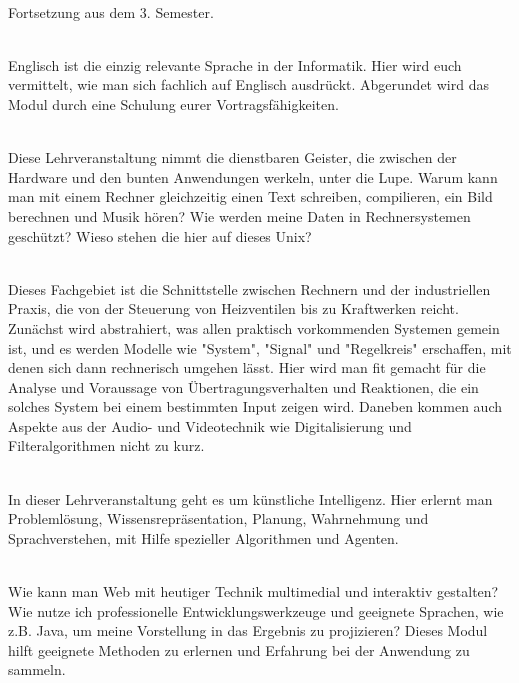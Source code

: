 \textbf{} \\
Fortsetzung aus dem 3. Semester.

\textbf{} \\
Englisch ist die einzig relevante Sprache in der Informatik.
Hier wird euch vermittelt, wie man sich fachlich auf Englisch ausdrückt.
Abgerundet wird das Modul durch eine Schulung eurer Vortragsfähigkeiten.

\hline

\textbf{} \\
Diese Lehrveranstaltung nimmt die dienstbaren Geister, die zwischen der Hardware und den bunten Anwendungen werkeln, unter die Lupe.
Warum kann man mit einem Rechner gleichzeitig einen Text schreiben, compilieren, ein Bild berechnen und Musik hören?
Wie werden meine Daten in Rechnersystemen geschützt?
Wieso stehen die hier auf dieses Unix?

\textbf{} \\
Dieses Fachgebiet ist die Schnittstelle zwischen Rechnern und der industriellen Praxis, die von der Steuerung von Heizventilen bis zu Kraftwerken reicht.
Zunächst wird abstrahiert, was allen praktisch vorkommenden Systemen gemein ist, und es werden Modelle wie "System", "Signal" und "Regelkreis" erschaffen, mit denen sich dann rechnerisch umgehen lässt.
Hier wird man fit gemacht für die Analyse und Voraussage von Übertragungsverhalten und Reaktionen, die ein solches System bei einem bestimmten Input zeigen wird.
Daneben kommen auch Aspekte aus der Audio- und Videotechnik wie Digitalisierung und Filteralgorithmen nicht zu kurz.

\textbf{} \\
In dieser Lehrveranstaltung geht es um künstliche Intelligenz.
Hier erlernt man Problemlösung, Wissensrepräsentation, Planung, Wahrnehmung und Sprachverstehen, mit Hilfe spezieller Algorithmen und Agenten.

\textbf{} \\
Wie kann man Web mit heutiger Technik multimedial und interaktiv gestalten?
Wie nutze ich professionelle Entwicklungswerkzeuge und geeignete Sprachen, wie z.B. Java, um meine Vorstellung in das Ergebnis zu projizieren?
Dieses Modul hilft geeignete Methoden zu erlernen und Erfahrung bei der Anwendung zu sammeln.

